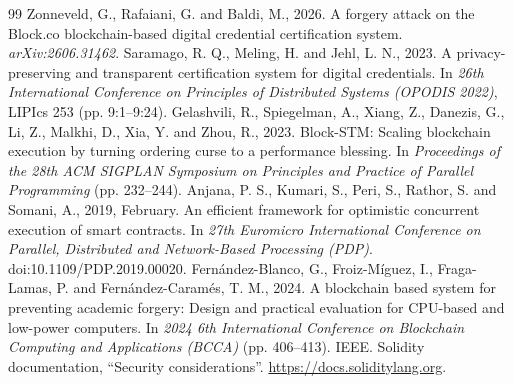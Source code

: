 \documentclass[10pt,twocolumn]{article}
\begin{document}
\begin{thebibliography}{99}\footnotesize
{} Zonneveld, G., Rafaiani, G. and Baldi, M., 2026. A forgery attack on the Block.co blockchain-based digital credential certification system. \textit{arXiv:2606.31462}.
 Saramago, R. Q., Meling, H. and Jehl, L. N., 2023. A privacy-preserving and transparent certification system for digital credentials. In \textit{26th International Conference on Principles of Distributed Systems (OPODIS 2022)}, LIPIcs 253 (pp. 9:1--9:24).
 Gelashvili, R., Spiegelman, A., Xiang, Z., Danezis, G., Li, Z., Malkhi, D., Xia, Y. and Zhou, R., 2023. Block-STM: Scaling blockchain execution by turning ordering curse to a performance blessing. In \textit{Proceedings of the 28th ACM SIGPLAN Symposium on Principles and Practice of Parallel Programming} (pp. 232--244).
 Anjana, P. S., Kumari, S., Peri, S., Rathor, S. and Somani, A., 2019, February. An efficient framework for optimistic concurrent execution of smart contracts. In \textit{27th Euromicro International Conference on Parallel, Distributed and Network-Based Processing (PDP)}. doi:10.1109/PDP.2019.00020.
 Fern\'andez-Blanco, G., Froiz-M\'iguez, I., Fraga-Lamas, P. and Fern\'andez-Caram\'es, T. M., 2024. A blockchain based system for preventing academic forgery: Design and practical evaluation for CPU-based and low-power computers. In \textit{2024 6th International Conference on Blockchain Computing and Applications (BCCA)} (pp. 406--413). IEEE.
 Solidity documentation, ``Security considerations''. \url{https://docs.soliditylang.org}.
\end{thebibliography}
\end{document}
